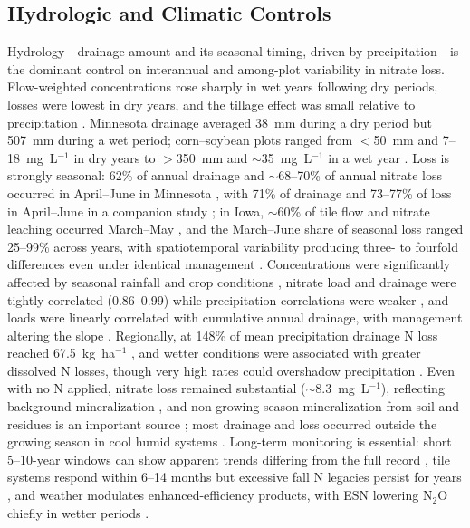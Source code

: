 \subsection{Hydrologic and Climatic Controls}

Hydrology---drainage amount and its seasonal timing, driven by precipitation---is the dominant control on interannual and among-plot variability in nitrate loss. Flow-weighted concentrations rose sharply in wet years following dry periods, losses were lowest in dry years, and the tillage effect was small relative to precipitation \parencite{RANDALL1995}. Minnesota drainage averaged 38~mm during a dry period but 507~mm during a wet period; corn--soybean plots ranged from $<$50~mm and 7--18~mg~L$^{-1}$ in dry years to $>$350~mm and $\sim$35~mg~L$^{-1}$ in a wet year \parencite{Randall2001}. Loss is strongly seasonal: 62\% of annual drainage and $\sim$68--70\% of annual nitrate loss occurred in April--June in Minnesota \parencite{Randall2003}, with 71\% of drainage and 73--77\% of loss in April--June in a companion study \parencite{Randall2005}; in Iowa, $\sim$60\% of tile flow and nitrate leaching occurred March--May \parencite{Bakhsh2007}, and the March--June share of seasonal loss ranged 25--99\% across years, with spatiotemporal variability producing three- to fourfold differences even under identical management \parencite{Bakhsh2010}. Concentrations were significantly affected by seasonal rainfall and crop conditions \parencite{Bakhsh2005}, nitrate load and drainage were tightly correlated (0.86--0.99) while precipitation correlations were weaker \parencite{Masri2024}, and loads were linearly correlated with cumulative annual drainage, with management altering the slope \parencite{OBrien2022}. Regionally, at 148\% of mean precipitation drainage N loss reached 67.5~kg~ha$^{-1}$ \parencite{Zhao2016}, and wetter conditions were associated with greater dissolved N losses, though very high rates could overshadow precipitation \parencite{Christianson2015b}. Even with no N applied, nitrate loss remained substantial ($\sim$8.3~mg~L$^{-1}$), reflecting background mineralization \parencite{Waring2022}, and non-growing-season mineralization from soil and residues is an important source \parencite{Gentry2024}; most drainage and loss occurred outside the growing season in cool humid systems \parencite{Gordon2005}. Long-term monitoring is essential: short 5--10-year windows can show apparent trends differing from the full record \parencite{Clifford2023}, tile systems respond within 6--14 months but excessive fall N legacies persist for years \parencite{Jaynes2015}, and weather modulates enhanced-efficiency products, with ESN lowering N$_2$O chiefly in wetter periods \parencite{Menegaz2025}.

